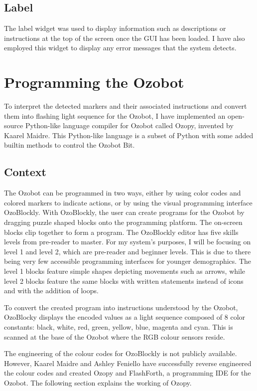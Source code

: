 \documentclass[oneside,%
                    author={Malak Hajji},
                    degree={BSc},
                    title={Designing An Accessible Computational Toolkit For Students},
                  subtitle={With Mixed Visual Abilities}]{dissertation}
\begin{document}
\subsection{Label}
The label widget was used to display information such as descriptions or instructions at the top of the screen once the GUI has been loaded. I have also employed this widget to display any error messages that the system detects.

\section{Programming the Ozobot}
To interpret the detected markers and their associated instructions and convert them into flashing light sequence for the Ozobot, I have implemented an open-source Python-like language compiler for Ozobot called Ozopy, invented by Kaarel Maidre\cite{ozopy}. This Python-like language is a subset of Python with some added builtin methods to control the Ozobot Bit.

\subsection{Context}

The Ozobot can be programmed in two ways, either by using color codes and colored markers to indicate actions, or by using the visual programming interface OzoBlockly. With OzoBlockly, the user can create programs for the Ozobot by dragging puzzle shaped blocks onto the programming platform. The on-screen blocks clip together to form a program. The OzoBlockly editor has five skills levels from pre-reader to master.
For my system’s purposes, I will be focusing on level 1 and level 2, which are pre-reader and beginner levels. This is due to there being very few accessible programming interfaces for younger demographics. The level 1 blocks feature simple shapes depicting movements such as arrows, while level 2 blocks feature the same blocks with written statements instead of icons and with the addition of loops. 

To convert the created program into instructions understood by the Ozobot, OzoBlocky displays the encoded values as a light sequence composed of 8 color constants: black, white, red, green, yellow, blue, magenta and cyan. This is scanned at the base of the Ozobot where the RGB colour sensors reside. 

The engineering of the colour codes for OzoBlockly is not publicly available. However, Kaarel Maidre and Ashley Feniello have successfully reverse engineered the colour codes and created Ozopy and FlashForth\cite{ashley}, a programming IDE for the Ozobot. The following section explains the working of Ozopy.  
\end{document}
